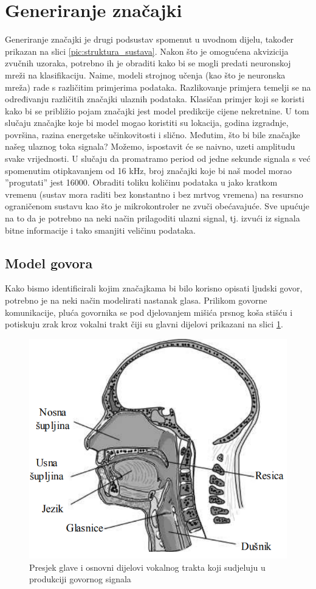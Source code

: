 \section{Generiranje značajki}
\label{sec:gen}

Generiranje značajki je drugi podsustav spomenut u uvodnom dijelu, također
prikazan na slici \ref{pic:struktura_sustava}. Nakon što je omogućena akvizicija
zvučnih uzoraka, potrebno ih je obraditi kako bi se mogli predati neuronskoj mreži 
na klasifikaciju. Naime, modeli strojnog učenja (kao što je neuronska mreža) rade
s različitim primjerima podataka. Razlikovanje primjera temelji se na određivanju
različitih značajki ulaznih podataka. Klasičan primjer koji se koristi kako bi se 
približio pojam značajki jest model predikcije cijene
nekretnine. U tom slučaju značajke koje bi model mogao koristiti su lokacija,
godina izgradnje, površina, razina energetske učinkovitosti i slično. Međutim, što
bi bile značajke našeg ulaznog toka signala? Možemo, ispostavit će se naivno, uzeti
amplitudu svake vrijednosti. U slučaju da promatramo period od jedne sekunde
signala s već spomenutim otipkavanjem od 16 kHz, broj značajki koje bi naš model
morao ”progutati” jest 16000. Obraditi toliku količinu podataka u jako kratkom
vremenu (sustav mora raditi bez konstantno i bez mrtvog vremena) na resursno
ograničenom sustavu kao što je mikrokontroler ne zvuči obećavajuće. Sve 
upućuje na to da je potrebno na neki način prilagoditi ulazni signal, tj. izvući
iz signala bitne informacije i tako smanjiti veličinu podataka. 

\subsection{Model govora}
\label{sec:speech}

Kako bismo identificirali kojim značajkama bi bilo korisno opisati ljudski govor,
potrebno je na neki način modelirati nastanak glasa. Prilikom govorne komunikacije,
pluća govornika se pod djelovanjem mišića prsnog koša stišću i potiskuju zrak kroz
vokalni trakt čiji su glavni dijelovi prikazani na slici \ref{pic:glas}.

\begin{figure}[htb]
    \centering
    \includegraphics[width=0.55\linewidth]{Chapters/struktura_sustava/generiranje_znacajki/glas.png} 
    \caption{Presjek glave i osnovni dijelovi vokalnog trakta koji sudjeluju u produkciji govornog signala \cite{petrinovic2002}}
    \label{pic:glas}
\end{figure}

